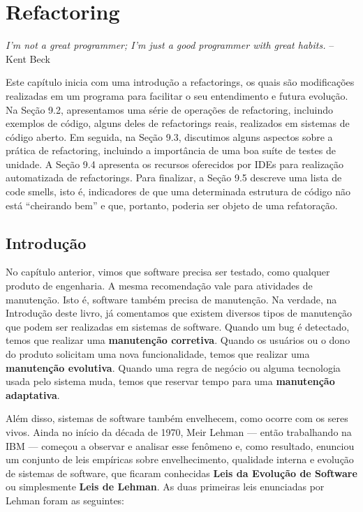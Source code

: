 \documentclass[
  11pt,
  twoside]{book}
\renewenvironment{quote}{\centering \vspace{1.5ex} \begin{tcolorbox}[colback=backcolor, width=4.9in]}{\end{tcolorbox}}
\begin{document}
\hypertarget{refactoring}{%
\chapter{Refactoring}\label{refactoring}}

\begin{quote}
\emph{I'm not a great programmer; I'm just a good programmer with great
habits.} -- Kent Beck
\end{quote}

Este capítulo inicia com uma introdução a refactorings, os quais são
modificações realizadas em um programa para facilitar o seu entendimento
e futura evolução. Na Seção 9.2, apresentamos uma série de operações de
refactoring, incluindo exemplos de código, alguns deles de refactorings
reais, realizados em sistemas de código aberto. Em seguida, na Seção
9.3, discutimos alguns aspectos sobre a prática de refactoring,
incluindo a importância de uma boa suíte de testes de unidade. A Seção
9.4 apresenta os recursos oferecidos por IDEs para realização
automatizada de refactorings. Para finalizar, a Seção 9.5 descreve uma
lista de code smells, isto é, indicadores de que uma determinada
estrutura de código não está ``cheirando bem'' e que, portanto, poderia
ser objeto de uma refatoração.

\hypertarget{introduuxe7uxe3o-6}{%
\section{Introdução}\label{introduuxe7uxe3o-6}}


No capítulo anterior, vimos que software precisa ser testado, como
qualquer produto de engenharia. A mesma recomendação vale para
atividades de manutenção. Isto é, software também precisa de manutenção.
Na verdade, na Introdução deste livro, já comentamos que existem
diversos tipos de manutenção que podem ser realizadas em sistemas de
software. Quando um bug é detectado, temos que realizar uma
\textbf{manutenção corretiva}. Quando os usuários ou o dono do produto
solicitam uma nova funcionalidade, temos que realizar uma
\textbf{manutenção evolutiva}. Quando uma regra de negócio ou alguma
tecnologia usada pelo sistema muda, temos que reservar tempo para uma
\textbf{manutenção} \textbf{adaptativa}.

 
 Além disso, sistemas de software também envelhecem,
como ocorre com os seres vivos. Ainda no início da década de 1970, Meir
Lehman --- então trabalhando na IBM --- começou a observar e analisar
esse fenômeno e, como resultado, enunciou um conjunto de leis empíricas
sobre envelhecimento, qualidade interna e evolução de sistemas de
software, que ficaram conhecidas \textbf{Leis da Evolução de Software}
ou simplesmente \textbf{Leis de Lehman}. As duas primeiras leis
enunciadas por Lehman foram as seguintes:
\end{document}

